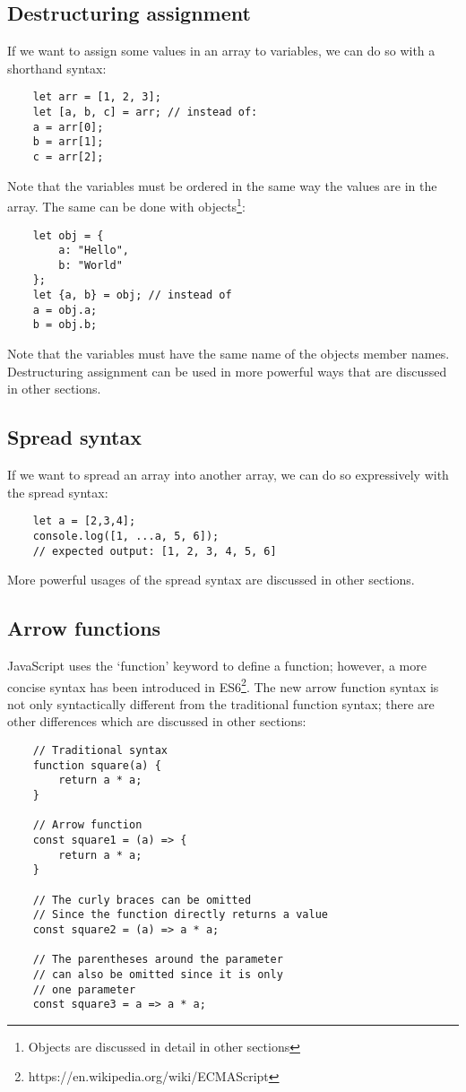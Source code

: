 \documentclass[11pt,a4paper]{article}
\begin{document}
\subsection{Destructuring assignment}
If we want to assign some values in an array to variables, we can do so with a shorthand syntax:
\begin{verbatim}
    let arr = [1, 2, 3];
    let [a, b, c] = arr; // instead of:
    a = arr[0];
    b = arr[1];
    c = arr[2];
\end{verbatim}
Note that the variables must be ordered in the same way the values are in the array.
The same can be done with objects\footnote{Objects are discussed in detail in other sections}:
\begin{verbatim}
    let obj = {
        a: "Hello",
        b: "World"
    };
    let {a, b} = obj; // instead of
    a = obj.a;
    b = obj.b;
\end{verbatim}
Note that the variables must have the same name of the objects member names. Destructuring assignment can be used in more
powerful ways that are discussed in other sections.

\subsection{\label{spread_syntax}Spread syntax}
If we want to spread an array into another array, we can do so expressively with the spread syntax:
\begin{verbatim}
    let a = [2,3,4];
    console.log([1, ...a, 5, 6]);
    // expected output: [1, 2, 3, 4, 5, 6]
\end{verbatim}
More powerful usages of the spread syntax are discussed in other sections.

\subsection{\label{arrow_functions}Arrow functions}
JavaScript uses the `function' keyword to define a function; however, a more concise syntax has been introduced in
ES6\footnote{https://en.wikipedia.org/wiki/ECMAScript}. The new arrow function syntax is not only syntactically
different from the traditional function syntax; there are other differences which are discussed in other sections:
\begin{verbatim}
    // Traditional syntax
    function square(a) {
        return a * a;
    }

    // Arrow function
    const square1 = (a) => {
        return a * a;
    }

    // The curly braces can be omitted
    // Since the function directly returns a value
    const square2 = (a) => a * a;

    // The parentheses around the parameter
    // can also be omitted since it is only
    // one parameter
    const square3 = a => a * a;
\end{verbatim}
\end{document}
